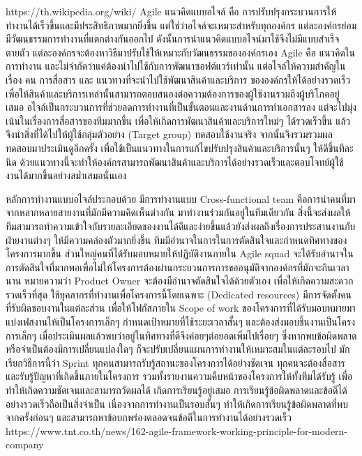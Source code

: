   https://th.wikipedia.org/wiki/%
  Agile
    แนวคิดแบบอไจล์ คือ การปรับปรุงกระบวนการให้ทำงานได้เร็วขึ้นและมีประสิทธิภาพมากยิ่งขึ้น แต่ใช่ว่าอไจล์จะเหมาะสำหรับทุกองค์กร แต่ละองค์กรย่อมมีวัฒนธรรมการทำงานที่แตกต่างกันออกไป ดังนั้นการนำแนวคิดแบบอไจน์มาใช้จึงไม่มีแบบสำเร็จตายตัว แต่ละองค์กรจะต้องหาวิธีมาปรับใช้ให้เหมาะกับวัฒนธรรมขององค์กรเอง
    Agile คือ แนวคิดในการทำงาน และไม่จำกัดว่าแค่ต้องนำไปใช้กับการพัฒนาซอฟต์แวร์เท่านั้น แต่อไจล์ให้ความสำคัญในเรื่อง คน การสื่อสาร และ แนวทางที่จะนำไปใช้พัฒนาสินค้าและบริการ ขององค์กรให้ได้อย่างรวดเร็ว เพื่อให้สินค้าและบริการเหล่านั้นสามารถตอบสนองต่อความต้องการของผู้ใช้งานรวมถึงผู้บริโภคอยู่เสมอ
    อไจล์เป็นกระบวนการที่ช่วยลดการทำงานที่เป็นขั้นตอนและงานด้านการทำเอกสารลง แต่จะไปมุ่งเน้นในเรื่องการสื่อสารของทีมมากขึ้น เพื่อให้เกิดการพัฒนาสินค้าและบริการใหม่ๆ ได้รวดเร็วขึ้น แล้วจึงนำสิ่งที่ได้ไปให้ผู้ใช้กลุ่มตัวอย่าง (Target group) ทดสอบใช้งานจริง จากนั้นจึงรวมรวมผลทดสอบมาประเมินดูอีกครั้ง เพื่อใช้เป็นแนวทางในการแก้ไขปรับปรุงสินค้าและบริการนั้นๆ ให้ดีขึ้นทีละนิด ด้วยแนวทางนี้จะทำให้องค์กรสามารถพัฒนาสินค้าและบริการได้อย่างรวดเร็วและตอบโจทย์ผู้ใช้งานได้มากขึ้นอย่างสม่ำเสมอนั่นเอง
  
  หลักการทำงานแบบอไจล์ประกอบด้วย
  มีการทำงานแบบ Cross-functional team คือการนำคนที่มาจากหลากหลายสายงานที่มักมีความคิดเห็นต่างกัน มาทำงานร่วมกันอยู่ในทีมเดียวกัน สิ่งนี้จะส่งผลให้ทีมสามารถทำความเข้าใจกับรายละเอียดของงานได้ดีและง่ายขึ้นแล้วยังส่งผลถึงเรื่องการประสานงานกับฝ่ายงานต่างๆ ให้มีความคล่องตัวมากยิ่งขึ้น
  ทีมมีอำนาจในการในการตัดสินใจและกำหนดทิศทางของโครงการมากขึ้น ส่วนใหญ่คนที่ได้รับมอบหมายให้ปฏิบัติงานภายใน Agile squad จะได้รับอำนาจในการตัดสินใจที่มากพอเพื่อไม่ให้โครงการต้องผ่านกระบวนการการขออนุมัติจากองค์กรที่มักจะกินเวลานาน หมายความว่า Product Owner จะต้องมีอำนาจตัดสินใจได้ด้วยตัวเอง เพื่อให้เกิดความสะดวกรวดเร็วที่สุด
  ใช้บุคลากรที่ทำงานเพื่อโครงการนี้โดยเฉพาะ (Dedicated resources) มีการจัดตั้งคนที่รับผิดชอบงานในแต่ละส่วน เพื่อให้โฟกัสภายใน Scope  of work ของโครงการที่ได้รับมอบหมายมา
  แบ่งเฟสงานให้เป็นโครงการเล็กๆ กำหนดเป้าหมายที่ใช้ระยะเวลาสั้นๆ และต้องส่งมอบชิ้นงานเป็นโครงการเล็กๆ เมื่อประเมินผลแล้วพบว่าอยู่ในทิศทางที่ดีจึงค่อยๆต่อยอดเพิ่มไปเรื่อยๆ ซึ่งหากพบข้อผิดพลาดหรือจำเป็นต้องมีการเปลี่ยนแปลงใดๆ ก็จะปรับเปลี่ยนแผนการทำงานให้เหมาะสมในแต่ละรอบไป มักเรียกวิธีการนี้ว่า Sprint
  ทุกคนสามารถรับรู้สถานะของโครงการได้อย่างชัดเจน ทุกคนจะต้องสื่อสารและรับรู้ปัญหาที่เกิดขึ้นภายในโครงการ รวมทั้งรายงานความคืบหน้าของโครงการให้ทั้งทีมได้รับรู้ เพื่อทำให้เกิดความชัดเจนและสามารถวัดผลได้
  เกิดการเรียนรู้อยู่เสมอ การเรียนรู้ข้อผิดพลาดและข้อดีได้อย่างรวดเร็วถือเป็นสิ่งจำเป็น เนื่องจากการทำงานเป็นรอบสั้นๆ ทำให้เกิดการเรียนรู้ข้อผิดพลาดที่พบจากครั้งก่อนๆ และสามารถหาข้อบกพร่องตลอดจนข้อดีในการทำงานได้อย่างรวดเร็ว
  https://www.tnt.co.th/news/162-agile-framework-working-principle-for-modern-company
  
